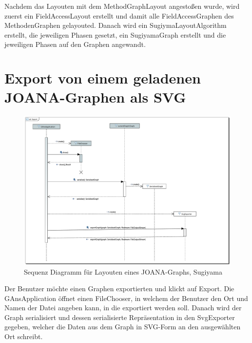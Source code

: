 Nachdem das Layouten mit dem MethodGraphLayout angestoßen wurde, wird zuerst ein FieldAccessLayout erstellt und damit alle FieldAccessGraphen des MethodenGraphen gelayouted. Danach wird ein SugiymaLayoutAlgorithm erstellt, die jeweiligen Phasen gesetzt, ein SugiyamaGraph erstellt und die jeweiligen Phasen auf den Graphen angewandt.

\newpage
\section{Export von einem geladenen JOANA-Graphen als SVG}

\begin{figure}[!htbp]
	\centering
	\includegraphics[width=450pt]{resourcen/SeqDiagramExport.PDF}
	\caption{Sequenz Diagramm für Layouten eines JOANA-Graphs, Sugiyama}
	\label{fig:seq:export}
\end{figure}

Der Benutzer möchte einen Graphen exportierten und klickt auf Export. Die GAnsApplication öffnet einen FileChooser, in welchem der Benutzer den Ort und Namen der Datei angeben kann, in die exportiert werden soll. Danach wird der Graph serialisiert und dessen serialisierte Repräsentation in den SvgExporter gegeben, welcher die Daten aus dem Graph in SVG-Form an den ausgewählten Ort schreibt.